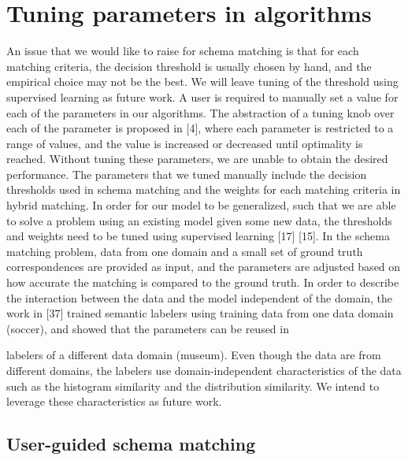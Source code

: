 \section{Tuning parameters in algorithms}
\label{sec:TuningParametersInAlgorithms}

An issue that we would like to raise for schema matching is that for each matching criteria, the decision threshold is usually chosen by hand, and the empirical choice may not be the best. We will leave tuning of the threshold using supervised learning as future work.
A user is required to manually set a value for each of the parameters in our algorithms. The abstraction of a tuning knob over each of the parameter is proposed in \cite{books/sp/bellahsene11}[4], where each parameter is restricted to a range of values, and the value is increased or decreased until optimality is reached. Without tuning these parameters, we are unable to obtain the desired performance. The parameters that we tuned manually include the decision thresholds used in schema matching and the weights for each matching criteria in hybrid matching. In order for our model to be generalized, such that we are able to solve a problem using an existing model given some new data, the thresholds and weights need to be tuned using supervised learning \cite{Duchateau2009YAM}[17] \cite{Doan2001Reconciling}[15]. In the schema matching problem, data from one domain and a small set of ground truth correspondences are provided as input, and the parameters are adjusted based on how accurate the matching is compared to the ground truth. In order to describe the interaction between the data and the model independent of the domain, the work in \cite{Pham2016Semantic}[37] trained semantic labelers using training data from one data domain (soccer), and showed that the parameters can be reused in

labelers of a different data domain (museum). Even though the data are from different domains, the labelers use domain-independent characteristics of the data such as the histogram similarity and the distribution similarity. We intend to leverage these characteristics as future work.

\subsection{User-guided schema matching}

